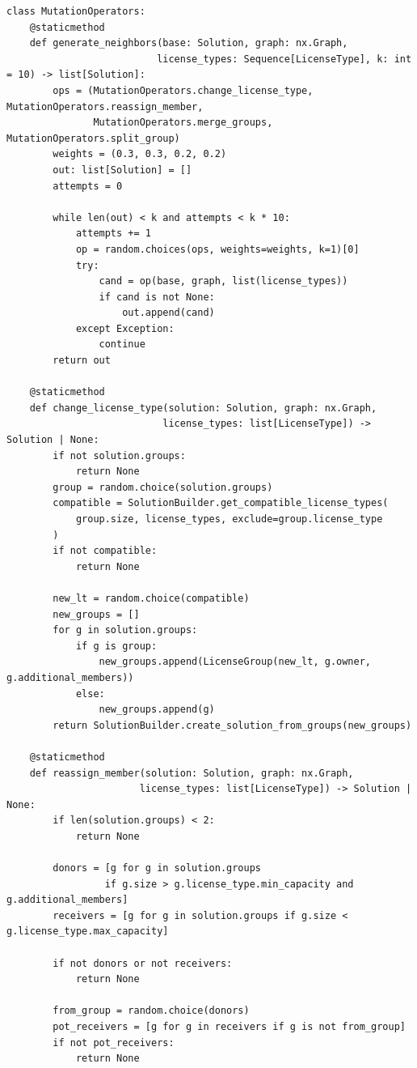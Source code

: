 {\footnotesize
\begin{verbatim}
class MutationOperators:
    @staticmethod
    def generate_neighbors(base: Solution, graph: nx.Graph,
                          license_types: Sequence[LicenseType], k: int = 10) -> list[Solution]:
        ops = (MutationOperators.change_license_type, MutationOperators.reassign_member,
               MutationOperators.merge_groups, MutationOperators.split_group)
        weights = (0.3, 0.3, 0.2, 0.2)
        out: list[Solution] = []
        attempts = 0

        while len(out) < k and attempts < k * 10:
            attempts += 1
            op = random.choices(ops, weights=weights, k=1)[0]
            try:
                cand = op(base, graph, list(license_types))
                if cand is not None:
                    out.append(cand)
            except Exception:
                continue
        return out

    @staticmethod
    def change_license_type(solution: Solution, graph: nx.Graph,
                           license_types: list[LicenseType]) -> Solution | None:
        if not solution.groups:
            return None
        group = random.choice(solution.groups)
        compatible = SolutionBuilder.get_compatible_license_types(
            group.size, license_types, exclude=group.license_type
        )
        if not compatible:
            return None

        new_lt = random.choice(compatible)
        new_groups = []
        for g in solution.groups:
            if g is group:
                new_groups.append(LicenseGroup(new_lt, g.owner, g.additional_members))
            else:
                new_groups.append(g)
        return SolutionBuilder.create_solution_from_groups(new_groups)

    @staticmethod
    def reassign_member(solution: Solution, graph: nx.Graph,
                       license_types: list[LicenseType]) -> Solution | None:
        if len(solution.groups) < 2:
            return None

        donors = [g for g in solution.groups
                 if g.size > g.license_type.min_capacity and g.additional_members]
        receivers = [g for g in solution.groups if g.size < g.license_type.max_capacity]

        if not donors or not receivers:
            return None

        from_group = random.choice(donors)
        pot_receivers = [g for g in receivers if g is not from_group]
        if not pot_receivers:
            return None


\end{verbatim}}
